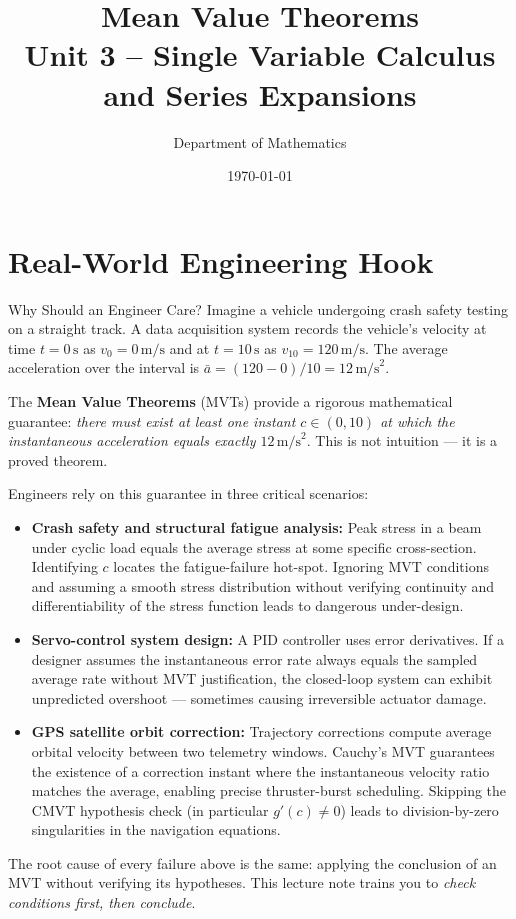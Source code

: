 \documentclass[12pt,a4paper]{article}
\title{\textbf{Mean Value Theorems} \\ \large Unit 3 -- Single Variable Calculus and Series Expansions}
\author{Department of Mathematics}
\date{\today}
\begin{document}
\maketitle
\tableofcontents
\newpage

\section{Real-World Engineering Hook}

\begin{curiositybox}{Why Should an Engineer Care?}
Imagine a vehicle undergoing crash safety testing on a straight track. A data acquisition system records
the vehicle's velocity at time $t = 0\,\text{s}$ as $v_0 = 0\,\text{m/s}$ and at $t = 10\,\text{s}$ as
$v_{10} = 120\,\text{m/s}$. The average acceleration over the interval is
$\bar{a} = (120 - 0)/10 = 12\,\text{m/s}^2$.

The \textbf{Mean Value Theorems} (MVTs) provide a rigorous mathematical guarantee:
\emph{there must exist at least one instant $c \in (0, 10)$ at which the instantaneous acceleration
equals exactly $12\,\text{m/s}^2$}. This is not intuition --- it is a proved theorem.

Engineers rely on this guarantee in three critical scenarios:
\begin{itemize}
  \item \textbf{Crash safety and structural fatigue analysis:} Peak stress in a beam under cyclic load
        equals the average stress at some specific cross-section. Identifying $c$ locates the
        fatigue-failure hot-spot. Ignoring MVT conditions and assuming a smooth stress distribution
        without verifying continuity and differentiability of the stress function leads to dangerous
        under-design.
  \item \textbf{Servo-control system design:} A PID controller uses error derivatives. If a designer
        assumes the instantaneous error rate always equals the sampled average rate without MVT
        justification, the closed-loop system can exhibit unpredicted overshoot --- sometimes causing
        irreversible actuator damage.
  \item \textbf{GPS satellite orbit correction:} Trajectory corrections compute average orbital velocity
        between two telemetry windows. Cauchy's MVT guarantees the existence of a correction instant
        where the instantaneous velocity ratio matches the average, enabling precise thruster-burst
        scheduling. Skipping the CMVT hypothesis check (in particular $g'(c) \neq 0$) leads to
        division-by-zero singularities in the navigation equations.
\end{itemize}

The root cause of every failure above is the same: applying the conclusion of an MVT without
verifying its hypotheses. This lecture note trains you to \emph{check conditions first, then conclude}.
\end{curiositybox}
\end{document}
